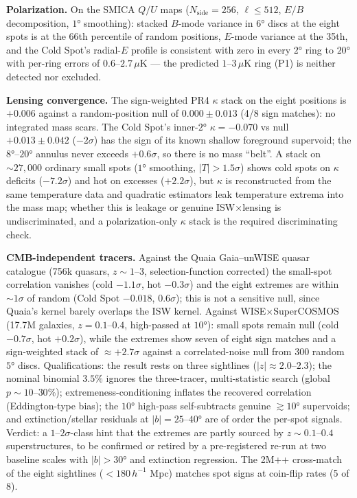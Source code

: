 \documentclass[
]{article}
\begin{document}
\textbf{Polarization.} On the SMICA \(Q/U\) maps
(\(N_{\text{side}} = 256\), \(\ell \leq 512\), \(E/B\) decomposition,
\(1°\) smoothing): stacked \(B\)-mode variance in \(6°\) discs at the
eight spots is at the 66th percentile of random positions, \(E\)-mode
variance at the 35th, and the Cold Spot's radial-\(E\) profile is
consistent with zero in every \(2°\) ring to \(20°\) with per-ring
errors of \(0.6\)--\(2.7\,\mu\)K --- the predicted \(1\)--\(3\,\mu\)K
ring (P1) is neither detected nor excluded.

\textbf{Lensing convergence.} The sign-weighted PR4 \(\kappa\) stack on
the eight positions is \(+0.006\) against a random-position null of
\(0.000 \pm 0.013\) (4/8 sign matches): no integrated mass scars. The
Cold Spot's inner-\(2°\) \(\kappa = -0.070\) vs null
\(+0.013 \pm 0.042\) (\(-2\sigma\)) has the sign of its known shallow
foreground supervoid; the \(8°\)--\(20°\) annulus never exceeds
\(+0.6\sigma\), so there is no mass ``belt''. A stack on
\(\sim\!27{,}000\) ordinary small spots (\(1°\) smoothing,
\(|T| > 1.5\sigma\)) shows cold spots on \(\kappa\) deficits
(\(-7.2\sigma\)) and hot on excesses (\(+2.2\sigma\)), but \(\kappa\) is
reconstructed from the same temperature data and quadratic estimators
leak temperature extrema into the mass map; whether this is leakage or
genuine ISW\(\times\)lensing is undiscriminated, and a polarization-only
\(\kappa\) stack is the required discriminating check.

\textbf{CMB-independent tracers.} Against the Quaia Gaia--unWISE quasar
catalogue (756k quasars, \(z \sim 1\)--\(3\), selection-function
corrected) the small-spot correlation vanishes (cold \(-1.1\sigma\), hot
\(-0.3\sigma\)) and the eight extremes are within \(\sim\!1\sigma\) of
random (Cold Spot \(-0.018\), \(0.6\sigma\)); this is not a sensitive
null, since Quaia's kernel barely overlaps the ISW kernel. Against
WISE\(\times\)SuperCOSMOS (17.7M galaxies, \(z = 0.1\)--\(0.4\),
high-passed at \(10°\)): small spots remain null (cold \(-0.7\sigma\),
hot \(+0.2\sigma\)), while the extremes show seven of eight sign matches
and a sign-weighted stack of \(\approx +2.7\sigma\) against a
correlated-noise null from 300 random \(5°\) discs. Qualifications: the
result rests on three sightlines (\(|z| \approx 2.0\)--\(2.3\)); the
nominal binomial \(3.5\%\) ignores the three-tracer, multi-statistic
search (global \(p \sim 10\)--\(30\%\)); extremeness-conditioning
inflates the recovered correlation (Eddington-type bias); the \(10°\)
high-pass self-subtracts genuine \(\gtrsim 10°\) supervoids; and
extinction/stellar residuals at \(|b| = 25\)--\(40°\) are of order the
per-spot signals. Verdict: a \(1\)--\(2\sigma\)-class hint that the
extremes are partly sourced by \(z \sim 0.1\)--\(0.4\) superstructures,
to be confirmed or retired by a pre-registered re-run at two baseline
scales with \(|b| > 30°\) and extinction regression. The 2M++
cross-match of the eight sightlines (\(< 180\,h^{-1}\) Mpc) matches spot
signs at coin-flip rates (5 of 8).
\end{document}
